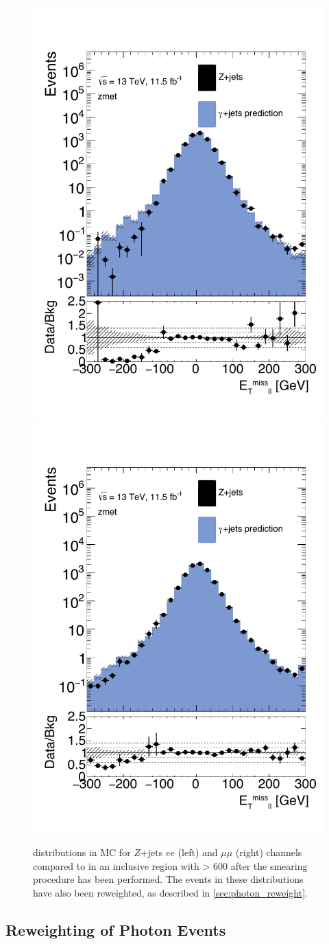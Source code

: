 \begin{centering}
\begin{figure}[!hbt]
\myfloatalign
\includegraphics[width=.48\linewidth]{figures/photons/MC_hist_METl_Pt_0_ee_2j_2016_mcmetl_ptsmrw_smear_zmet_.pdf}
\includegraphics[width=.48\linewidth]{figures/photons/MC_hist_METl_Pt_0_mm_2j_2016_mcmetl_ptsmrw_smear_zmet_.pdf}
\caption{\metl distributions in \ac{MC} for $Z$+jets $ee$ (left) and $\mu\mu$ (right) channels compared to  \gjets in an inclusive region with \HT > 600 \gev after the smearing procedure has been performed. The events in these distributions have also been \pt reweighted, as described in \autoref{sec:photon_reweight}.}
\label{fig:photon_metparallelsmeared}
\end{figure}
\end{centering}

\subsection{\pt Reweighting of Photon Events}
\label{sec:photon_reweight}

